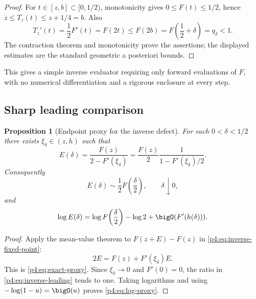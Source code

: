 \documentclass[11pt]{article}
\numberwithin{equation}{section}
\newtheorem{proposition}[theorem]{Proposition}
\theoremstyle{definition}
\theoremstyle{remark}
\begin{document}
\begin{proof}
For $t\in[z,b]\subset[0,1/2)$, monotonicity gives $0\le F(t)\le1/2$, hence
$z\le T_z(t)\le z+1/4=b$.  Also
\[
 T_z'(t)=\frac12F'(t)=F(2t)
 \le F(2b)=F\!\left(\frac12+\delta\right)=q_\delta<1.
\]
The contraction theorem and monotonicity prove the assertions; the displayed estimates are the standard geometric a posteriori bounds.
\end{proof}

This gives a simple inverse evaluator requiring only forward evaluations of $F$, with no numerical differentiation and a rigorous enclosure at every step.

\subsection{Sharp leading comparison}
\begin{proposition}[Endpoint proxy for the inverse defect]
\label{p4:prop:inverse-proxy}
For each $0<\delta<1/2$ there exists $\xi_\delta\in(z,h)$ such that
\begin{equation}
 E(\delta)=\frac{F(z)}{2-F'(\xi_\delta)}
 =\frac{F(z)}2\frac1{1-F'(\xi_\delta)/2}.
 \label{p4:eq:exact-proxy}
\end{equation}
Consequently
\begin{equation}
 E(\delta)\sim\frac12F\!\left(\frac\delta2\right),
 \qquad \delta\downarrow0,
 \label{p4:eq:inverse-leading}
\end{equation}
and
\begin{equation}
 \log E(\delta)
 =\log F\!\left(\frac\delta2\right)-\log2
  +\bigO(F'(h(\delta))).
 \label{p4:eq:log-proxy}
\end{equation}
\end{proposition}

\begin{proof}
Apply the mean-value theorem to $F(z+E)-F(z)$ in \eqref{p4:eq:inverse-fixed-point}:
\[
 2E=F(z)+F'(\xi_\delta)E.
\]
This is \eqref{p4:eq:exact-proxy}.  Since $\xi_\delta\to0$ and $F'(0)=0$, the ratio in \eqref{p4:eq:inverse-leading} tends to one.  Taking logarithms and using $-\log(1-u)=\bigO(u)$ proves \eqref{p4:eq:log-proxy}.
\end{proof}
\end{document}
